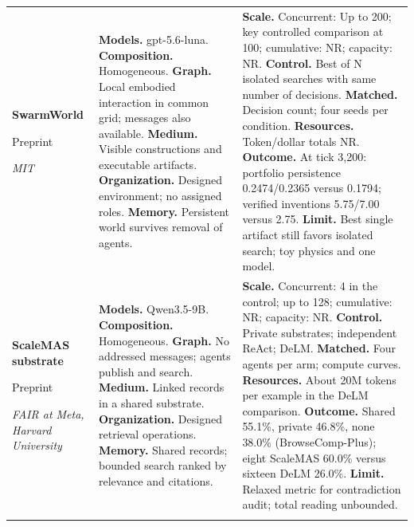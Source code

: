 \begin{longtable}{@{}>{\raggedright\arraybackslash}p{}>{\raggedright\arraybackslash}p{}>{\raggedright\arraybackslash}p{}@{}}
\textbf{SwarmWorld}\par \citep{prev-swarmworld}\par Preprint\par\emph{MIT} & \textbf{Models.} gpt-5.6-luna. \textbf{Composition.} Homogeneous. \textbf{Graph.} Local embodied interaction in common grid; messages also available. \textbf{Medium.} Visible constructions and executable artifacts. \textbf{Organization.} Designed environment; no assigned roles. \textbf{Memory.} Persistent world survives removal of agents. & \textbf{Scale.} Concurrent: Up to 200; key controlled comparison at 100; cumulative: NR; capacity: NR. \textbf{Control.} Best of N isolated searches with same number of decisions. \textbf{Matched.} Decision count; four seeds per condition. \textbf{Resources.} Token/dollar totals NR. \textbf{Outcome.} At tick 3,200: portfolio persistence 0.2474/0.2365 versus 0.1794; verified inventions 5.75/7.00 versus 2.75. \textbf{Limit.} Best single artifact still favors isolated search; toy physics and one model. \\ \addlinespace[5pt]
\textbf{ScaleMAS substrate}\par \citep{scalemas-substrate}\par Preprint\par\emph{FAIR at Meta, Harvard University} & \textbf{Models.} Qwen3.5-9B. \textbf{Composition.} Homogeneous. \textbf{Graph.} No addressed messages; agents publish and search. \textbf{Medium.} Linked records in a shared substrate. \textbf{Organization.} Designed retrieval operations. \textbf{Memory.} Shared records; bounded search ranked by relevance and citations. & \textbf{Scale.} Concurrent: 4 in the control; up to 128; cumulative: NR; capacity: NR. \textbf{Control.} Private substrates; independent ReAct; DeLM. \textbf{Matched.} Four agents per arm; compute curves. \textbf{Resources.} About 20M tokens per example in the DeLM comparison. \textbf{Outcome.} Shared 55.1\%, private 46.8\%, none 38.0\% (BrowseComp-Plus); eight ScaleMAS 60.0\% versus sixteen DeLM 26.0\%. \textbf{Limit.} Relaxed metric for contradiction audit; total reading unbounded. \\ \addlinespace[5pt]

\end{longtable}
